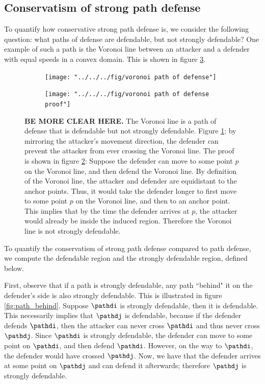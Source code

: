 \subsection{Conservatism of strong path defense}
To quantify how conservative strong path defense is, we consider the following question: what paths of defense are defendable, but not strongly defendable? One example of such a path is the Voronoi line between an attacker and a defender with equal speeds in a convex domain. This is shown in figure \ref{fig:voronoi_pod}.

\begin{figure}[h]
\centering

\begin{subfigure}{\textwidth}
\texttt{[image: "../../../fig/voronoi path of defense"]}
\caption{}
\label{subfig:vor_pod1}
\end{subfigure}

\begin{subfigure}{\textwidth}
\texttt{[image: "../../../fig/voronoi path of defense proof"]}
\caption{}
\label{subfig:vor_pod2}
\end{subfigure}

\caption{\textbf{BE MORE CLEAR HERE.} The Voronoi line is a path of defense that is defendable but not strongly defendable. Figure \ref{subfig:vor_pod1}: by mirroring the attacker's movement direction, the defender can prevent the attacker from ever crossing the Voronoi line. \newline\newline The proof is shown in figure \ref{subfig:vor_pod2}: Suppose the defender can move to some point $p$ on the Voronoi line, and then defend the Voronoi line. By definition of the Voronoi line, the attacker and defender are equidistant to the anchor points. Thus, it would take the defender longer to first move to some point $p$ on the Voronoi line, and then to an anchor point. This implies that by the time the defender arrives at $p$, the attacker would already be inside the induced region. Therefore the Voronoi line is not strongly defendable.}
\label{fig:voronoi_pod}
\end{figure}

To quantify the conservatism of strong path defense compared to path defense, we compute the defendable region and the strongly defendable region, defined below.

First, observe that if a path is strongly defendable, any path ``behind" it on the defender's side is also strongly defendable. This is illustrated in figure \ref{fig:path_behind}. Suppose $\pathdi$ is strongly defendable, then it is defendable. This necessarily implies that $\pathdj$ is defendable, because if the defender defends $\pathdi$, then the attacker can never cross $\pathdi$ and thus never cross $\pathdj$. Since $\pathdi$ is strongly defendable, the defender can move to some point on $\pathdi$, and then defend $\pathdi$. However, on the way to $\pathdi$, the defender would have crossed $\pathdj$. Now, we have that the defender arrives at some point on $\pathdj$ and can defend it afterwards; therefore $\pathdj$ is strongly defendable.

